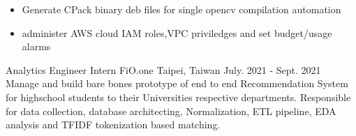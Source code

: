 \begin{cventries}
{\begin{itemize}
                \item {\scriptsize Generate CPack binary deb files for single opencv compilation automation}
                \item {\scriptsize administer AWS cloud IAM roles,VPC priviledges and set budget/usage alarms}
            \end{itemize}
    }
  \cventry
    {Analytics Engineer Intern} %
    {\newline FiO.one} %
    {Taipei, Taiwan} %
    {July. 2021 - Sept. 2021} %
    {Manage and build bare bones prototype of end to end Recommendation System for highschool students to their Universities respective departments. Responsible for data collection, database architecting, Normalization, ETL pipeline, EDA analysis and TFIDF tokenization based matching. }
\end{cventries}
